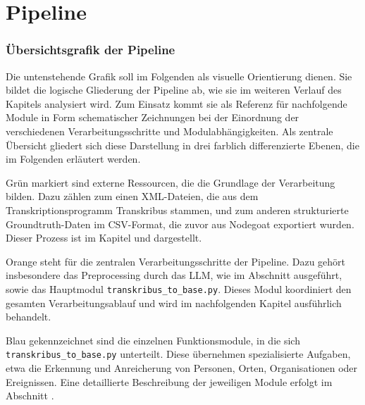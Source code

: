 \documentclass[12pt, a4paper, ngerman, bidi=default]{article}
\newcommand{\code}[1]{\colorbox{VeryLightGray}{\texttt{#1}}} %
\begin{document}
\section{Pipeline}

\subsubsection{Übersichtsgrafik der Pipeline}

Die untenstehende Grafik soll im Folgenden als visuelle Orientierung dienen. 
Sie bildet die logische Gliederung der Pipeline ab, wie sie im weiteren Verlauf des 
Kapitels analysiert wird. Zum Einsatz kommt sie als Referenz für nachfolgende Module in Form schematischer Zeichnungen bei der Einordnung der verschiedenen Verarbeitungsschritte und Modulabhängigkeiten. 
Als zentrale Übersicht gliedert sich diese Darstellung in drei farblich differenzierte Ebenen, die im Folgenden erläutert werden.

Grün markiert sind externe Ressourcen, die die Grundlage der Verarbeitung bilden. Dazu zählen 
zum einen XML-Dateien, die aus dem Transkriptionsprogramm Transkribus stammen, und zum anderen 
strukturierte Groundtruth-Daten im CSV-Format, die zuvor aus Nodegoat exportiert 
wurden. Dieser Prozess ist im Kapitel  und  dargestellt.

Orange steht für die zentralen Verarbeitungsschritte der Pipeline. Dazu gehört insbesondere das 
Preprocessing durch das LLM, wie im Abschnitt  
ausgeführt, sowie das Hauptmodul \code{transkribus\_to\_base.py}. Dieses Modul koordiniert den 
gesamten Verarbeitungsablauf und wird im nachfolgenden Kapitel  ausführlich behandelt.

Blau gekennzeichnet sind die einzelnen Funktionsmodule, in die sich \code{transkribus\_to\_base.py} 
unterteilt. Diese übernehmen spezialisierte Aufgaben, etwa die Erkennung und Anreicherung von Personen, 
Orten, Organisationen oder Ereignissen. Eine detaillierte Beschreibung der jeweiligen Module erfolgt im 
Abschnitt .
\end{document}
